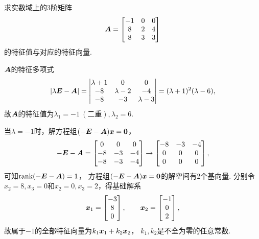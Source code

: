 \begin{example}
求实数域上的3阶矩阵\begin{equation*}
	\boldsymbol{A} = \begin{bmatrix}
		-1 & 0 & 0 \\
		8 & 2 & 4 \\
		8 & 3 & 3
	\end{bmatrix}
\end{equation*}的特征值与对应的特征向量.
\begin{solution}
\(\boldsymbol{A}\)的特征多项式\begin{equation*}
	\abs{\lambda\boldsymbol{E}-\boldsymbol{A}}
	= \begin{vmatrix}
		\lambda+1 & 0 & 0 \\
		-8 & \lambda-2 & -4 \\
		-8 & -3 & \lambda-3
	\end{vmatrix}
	= (\lambda+1)^2 (\lambda-6),
\end{equation*}
故\(\boldsymbol{A}\)的特征值为\(\lambda_1=-1\ (\text{二重}),
\lambda_2=6\).

当\(\lambda=-1\)时，解方程组\((-\boldsymbol{E}-\boldsymbol{A})\boldsymbol{x} = \boldsymbol0\)，\begin{equation*}
	-\boldsymbol{E}-\boldsymbol{A} = \begin{bmatrix}
		0 & 0 & 0 \\
		-8 & -3 & -4 \\
		-8 & -3 & -4
	\end{bmatrix} \to \begin{bmatrix}
		-8 & -3 & -4 \\
		0 & 0 & 0 \\
		0 & 0 & 0
	\end{bmatrix},
\end{equation*}
可知\(\rank(-\boldsymbol{E}-\boldsymbol{A}) = 1\)，
方程组\((-\boldsymbol{E}-\boldsymbol{A})\boldsymbol{x} = \boldsymbol0\)的解空间有2个基向量.
分别令\(x_2 = 8, x_3 = 0\)和\(x_2 = 0, x_3 = 2\)，得基础解系\begin{equation*}
	\boldsymbol{x}_1 = \begin{bmatrix} -3 \\ 8 \\ 0 \end{bmatrix},
	\qquad
	\boldsymbol{x}_2 = \begin{bmatrix} -1 \\ 0 \\ 2 \end{bmatrix},
\end{equation*}
故属于\(-1\)的全部特征向量为\(k_1 \boldsymbol{x}_1 + k_2 \boldsymbol{x}_2\)，
\(k_1,k_2\)是不全为零的任意常数.


\end{solution}
\end{example}
